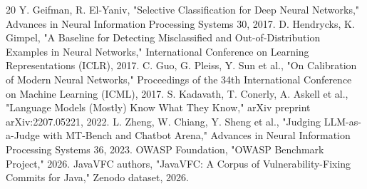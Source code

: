 \documentclass[conference]{IEEEtran}
\begin{document}
\begin{thebibliography}{20}
 Y. Geifman, R. El-Yaniv, "Selective Classification for Deep Neural Networks," Advances in Neural Information Processing Systems 30, 2017.
 D. Hendrycks, K. Gimpel, "A Baseline for Detecting Misclassified and Out-of-Distribution Examples in Neural Networks," International Conference on Learning Representations (ICLR), 2017.
 C. Guo, G. Pleiss, Y. Sun et al., "On Calibration of Modern Neural Networks," Proceedings of the 34th International Conference on Machine Learning (ICML), 2017.
 S. Kadavath, T. Conerly, A. Askell et al., "Language Models (Mostly) Know What They Know," arXiv preprint arXiv:2207.05221, 2022.
 L. Zheng, W. Chiang, Y. Sheng et al., "Judging LLM-as-a-Judge with MT-Bench and Chatbot Arena," Advances in Neural Information Processing Systems 36, 2023.
 OWASP Foundation, "OWASP Benchmark Project," 2026.
 JavaVFC authors, "JavaVFC: A Corpus of Vulnerability-Fixing Commits for Java," Zenodo dataset, 2026.
\end{thebibliography}
\end{document}
